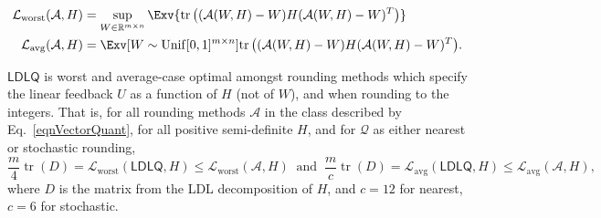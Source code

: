 \begin{align}
    \mathcal{L}_{\operatorname{worst}}(\mathcal{A}, H) &= \sup_{W \in \mathbb{R}^{m \times n}} \Exv{ \operatorname{tr}\left( ( \mathcal{A}(W, H) - W) H (\mathcal{A}(W, H) - W)^T \right) } 
    \label{eqnLworst}\\
    \mathcal{L}_{\operatorname{avg}}(\mathcal{A}, H)  &= \Exv[{W \sim \operatorname{Unif}[0,1]^{m \times n}}]{ \operatorname{tr}\left( ( \mathcal{A}(W, H) - W) H (\mathcal{A}(W, H) - W)^T \right) }.
    \label{eqnLavg}
\end{align}

\begin{theoremrep}\label{thmLDLopt}
$\mathsf{LDLQ}$ is worst and average-case optimal amongst rounding methods which specify the linear feedback $U$ as a function of $H$ (not of $W$), and when rounding to the integers. That is, for all rounding methods $\mathcal{A}$ in the class described by Eq.~\eqref{eqnVectorQuant}, for all positive semi-definite $H$, and for $\mathcal{Q}$ as either nearest or stochastic rounding,
\[
    \textstyle
    \frac{m}{4} \operatorname{tr}(D) = \mathcal{L}_{\operatorname{worst}}(\mathsf{LDLQ}, H) \leq \mathcal{L}_{\operatorname{worst}}(\mathcal{A}, H)
    \;\;\text{and}\;\;
    \frac{m}{c} \operatorname{tr}(D) = \mathcal{L}_{\operatorname{avg}}(\mathsf{LDLQ}, H) \leq \mathcal{L}_{\operatorname{avg}}(\mathcal{A}, H),
\]
where $D$ is the matrix from the LDL decomposition of $H$, and $c=12$ for nearest, $c=6$ for stochastic.
\end{theoremrep}


